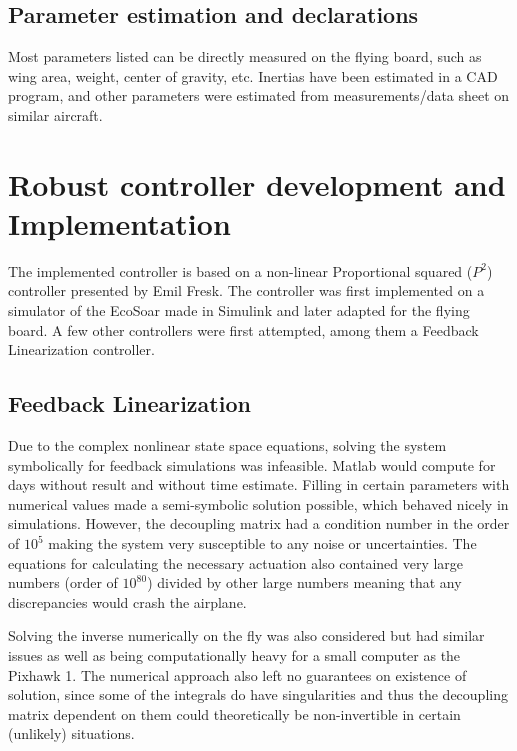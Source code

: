 \documentclass{article}
\begin{document}
\subsection{Parameter estimation and declarations}
Most parameters listed can be directly measured on the flying board, such as wing area, weight, center of gravity, etc.
Inertias have been estimated in a CAD program, and other parameters were estimated from measurements/data sheet on similar aircraft.


\section{\textbf{Robust controller development and Implementation}}

The implemented controller is based on a non-linear Proportional squared ($P^2$) controller presented by Emil Fresk\cite{P2}.
The controller was first implemented on a simulator of the EcoSoar made in Simulink and later adapted for the flying board.
A few other controllers were first attempted, among them a Feedback Linearization controller.

\subsection{Feedback Linearization}
Due to the complex nonlinear state space equations, solving the system symbolically for feedback simulations was infeasible.
Matlab would compute for days without result and without time estimate.
Filling in certain parameters with numerical values made a semi-symbolic solution possible, which behaved nicely in simulations.
However, the decoupling matrix had a condition number in the order of $10^5$ making the system very susceptible to any noise or uncertainties.
The equations for calculating the necessary actuation also contained very large numbers (order of $10^{80}$) divided by other large numbers meaning that any discrepancies would crash the airplane.

Solving the inverse numerically on the fly was also considered but had similar issues as well as being computationally heavy for a small computer as the Pixhawk 1.
The numerical approach also left no guarantees on existence of solution, since some of the integrals do have singularities and thus the decoupling matrix dependent on them could theoretically be non-invertible in certain (unlikely) situations.
\end{document}
